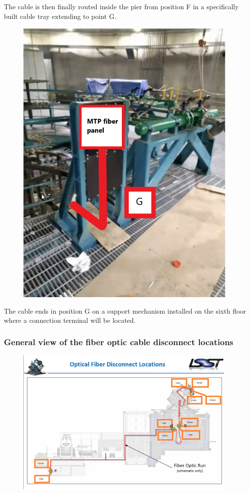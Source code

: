The cable is then finally routed inside the pier from position F in a specifically built cable tray extending to point G.

\begin{figure}
  \includegraphics[width=11cm]{images/21.png}
  \centering
  \label{fig:jlsimon}
\end{figure}

The cable ends in position G on a support mechanism installed on the sixth floor where a connection terminal will be located.


\subsubsection{General view of the fiber optic cable disconnect locations}

\begin{figure}
  \includegraphics[width=11cm]{images/22.png}
  \centering
  \label{fig:jlsimon}
\end{figure}


